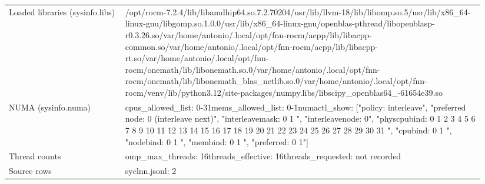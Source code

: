 \begin{longtable}{>{\raggedright\arraybackslash}p{0.23\linewidth}>{\raggedright\arraybackslash}p{0.71\linewidth}}
Loaded libraries (sysinfo.libs) & /\allowbreak{}opt/\allowbreak{}rocm-7.2.4/\allowbreak{}lib/\allowbreak{}libamdhip64.so.7.2.70204\newline /\allowbreak{}usr/\allowbreak{}lib/\allowbreak{}llvm-18/\allowbreak{}lib/\allowbreak{}libomp.so.5\newline /\allowbreak{}usr/\allowbreak{}lib/\allowbreak{}x86\_\allowbreak{}64-linux-gnu/\allowbreak{}libgomp.so.1.0.0\newline /\allowbreak{}usr/\allowbreak{}lib/\allowbreak{}x86\_\allowbreak{}64-linux-gnu/\allowbreak{}openblas-pthread/\allowbreak{}libopenblasp-r0.3.26.so\newline /\allowbreak{}var/\allowbreak{}home/\allowbreak{}antonio/\allowbreak{}.local/\allowbreak{}opt/\allowbreak{}fnn-rocm/\allowbreak{}acpp/\allowbreak{}lib/\allowbreak{}libacpp-common.so\newline /\allowbreak{}var/\allowbreak{}home/\allowbreak{}antonio/\allowbreak{}.local/\allowbreak{}opt/\allowbreak{}fnn-rocm/\allowbreak{}acpp/\allowbreak{}lib/\allowbreak{}libacpp-rt.so\newline /\allowbreak{}var/\allowbreak{}home/\allowbreak{}antonio/\allowbreak{}.local/\allowbreak{}opt/\allowbreak{}fnn-rocm/\allowbreak{}onemath/\allowbreak{}lib/\allowbreak{}libonemath.so.0\newline /\allowbreak{}var/\allowbreak{}home/\allowbreak{}antonio/\allowbreak{}.local/\allowbreak{}opt/\allowbreak{}fnn-rocm/\allowbreak{}onemath/\allowbreak{}lib/\allowbreak{}libonemath\_\allowbreak{}blas\_\allowbreak{}netlib.so.0\newline /\allowbreak{}var/\allowbreak{}home/\allowbreak{}antonio/\allowbreak{}.local/\allowbreak{}opt/\allowbreak{}fnn-rocm/\allowbreak{}venv/\allowbreak{}lib/\allowbreak{}python3.12/\allowbreak{}site-packages/\allowbreak{}numpy.libs/\allowbreak{}libscipy\_\allowbreak{}openblas64\_\allowbreak{}-61654e39.so \\
NUMA (sysinfo.numa) & cpus\_\allowbreak{}allowed\_\allowbreak{}list: 0-31\newline mems\_\allowbreak{}allowed\_\allowbreak{}list: 0-1\newline numactl\_\allowbreak{}show: ["policy: interleave", "preferred node: 0 (interleave next)", "interleavemask: 0 1 ", "interleavenode: 0", "physcpubind: 0 1 2 3 4 5 6 7 8 9 10 11 12 13 14 15 16 17 18 19 20 21 22 23 24 25 26 27 28 29 30 31 ", "cpubind: 0 1 ", "nodebind: 0 1 ", "membind: 0 1 ", "preferred: 0 1"] \\
Thread counts & omp\_\allowbreak{}max\_\allowbreak{}threads: 16\newline threads\_\allowbreak{}effective: 16\newline threads\_\allowbreak{}requested: not recorded \\
Source rows & syclnn.jsonl: 2 \\
\end{longtable}
